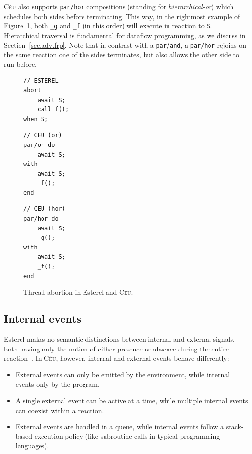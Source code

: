 \documentclass{acm_proc_article-sp}
\newcommand{\CEU}{\textsc{C\'{e}u}\xspace}
\newcommand{\code}[1] {{\small{\texttt{#1}}}}
\newcommand{\1}{\;}
\newcommand{\2}{\;\;}
\newcommand{\3}{\;\;\;}
\newcommand{\5}{\;\;\;\;\;}
\begin{document}
\CEU also supports \code{par/hor} compositions (standing for 
\emph{hierarchical-or}) which schedules both sides before terminating.
This way, in the rightmost example of Figure~\ref{lst.abortion}, both 
\code{\_g} and \code{\_f} (in this order) will execute in reaction to \code{S}.
Hierarchical traversal is fundamental for dataflow programming, as we discuss 
in Section~\ref{sec.adv.frp}.
Note that in contrast with a \code{par/and}, a \code{par/hor} rejoins on the 
same reaction one of the sides terminates, but also allows the other side to 
run before.

\begin{figure}[h]
\begin{minipage}[t]{0.32\linewidth}
\begin{lstlisting}
// ESTEREL
abort
    await S;
    call f();
when S;
\end{lstlisting}
\end{minipage}
%
\begin{minipage}[t]{0.32\linewidth}
\begin{lstlisting}
// CEU (or)
par/or do
    await S;
with
    await S;
    _f();
end
\end{lstlisting}
\end{minipage}
%
\begin{minipage}[t]{0.32\linewidth}
\begin{lstlisting}
// CEU (hor)
par/hor do
    await S;
    _g();
with
    await S;
    _f();
end
\end{lstlisting}
\end{minipage}
\caption{ Thread abortion in Esterel and \CEU. %
\label{lst.abortion}
}
\end{figure}

\subsection{Internal events}
\label{sec.ceu.ints}

Esterel makes no semantic distinctions between internal and external signals, 
both having only the notion of either presence or absence during the entire 
reaction~\cite{esterel.preemption}.
%
In \CEU, however, internal and external events behave differently:

\begin{itemize}
\item External events can only be emitted by the environment, while internal 
events only by the program.
\item A single external event can be active at a time, while multiple internal 
events can coexist within a reaction.
\item External events are handled in a queue, while internal events follow a 
stack-based execution policy (like subroutine calls in typical programming 
languages).
\end{itemize}
\end{document}
